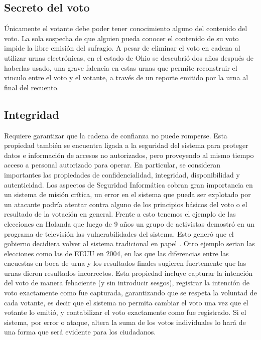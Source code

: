 \subsection{Secreto del voto}
Únicamente el votante debe poder tener conocimiento alguno del contenido del voto. La sola sospecha de que alguien pueda conocer el contenido de su voto impide la libre emisión del sufragio.
A pesar de eliminar el voto en cadena al utilizar urnas electrónicas, en el estado de Ohio se descubrió dos años después de haberlas usado, una grave falencia en estas urnas que permite reconstruir el vinculo entre el voto y el votante, a través de un reporte emitido por la urna al final del recuento.

\subsection{Integridad}
Requiere garantizar que la cadena de confianza no puede romperse. Esta propiedad también se encuentra ligada a la seguridad del sistema para proteger datos e información de accesos no autorizados, pero proveyendo al mismo tiempo acceso a personal autorizado para operar. En particular, se consideran importantes las propiedades de confidencialidad, integridad, disponibilidad y autenticidad. Los aspectos de Seguridad Informática cobran gran importancia en un sistema de misión crítica, un error en el sistema que pueda ser explotado por un atacante podría atentar contra alguno de los principios básicos del voto o el resultado de la votación en general. Frente a esto tenemos el ejemplo de las elecciones en Holanda que luego de 9 años un grupo de activistas demostró en un programa de televisión las vulnerabilidades del sistema. Esto generó que el gobierno decidiera volver al sistema tradicional en papel \cite{eleccionesHolanda}. Otro ejemplo serian las elecciones como las de EEUU en 2004, en las que las diferencias entre las encuestas en boca de urna y los resultados finales sugieren fuertemente que las urnas dieron resultados incorrectos.\newline
Esta propiedad incluye capturar la intención del voto de manera fehaciente (y sin introducir sesgos), registrar la intención de voto exactamente como fue capturada, garantizando que se respeta la voluntad de cada votante, es decir que el sistema no permita cambiar el voto una vez que el votante lo emitió, y contabilizar el voto exactamente como fue registrado. Si el sistema, por error o ataque, altera la suma de los votos individuales lo hará de una forma que será evidente para los ciudadanos.

